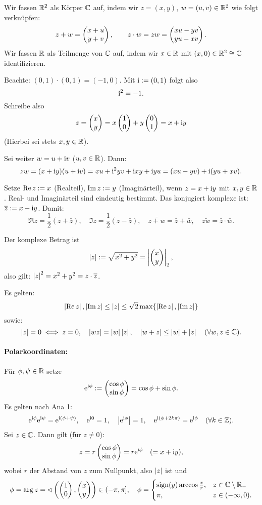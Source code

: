 \documentclass[a4paper,twoside,DIV15,BCOR12mm]{scrbook}
\begin{document}


Wir fassen $\mathbb{R}^2$ als Körper $\mathbb{C}$ auf, indem wir $z = (x,y)$, $w=(u,v)\in\mathbb{R}^2$ wie folgt verknüpfen:
\[z+w = \cmplx{x+u}{y+v},\qquad z\cdot w = zw = \cmplx{xu-yv}{yu-xv}.\]
Wir fassen $\mathbb{R}$ als Teilmenge von $\mathbb{C}$ auf, indem wir $x\in\mathbb{R}$ mit $(x,0)\in\mathbb{R}^2\cong\mathbb{C}$ identifizieren.

Beachte: $(0,1)\cdot(0,1) = (-1,0)$. Mit $\mathrm{i} := (0,1)$ folgt also
\[\mathrm{i}^2 = -1.\]
Schreibe also
\[z = \cmplx{x}{y} = x\cmplx{1}{0} + y\cmplx{0}{1} = x+\i y\]
(Hierbei sei stets $x,y\in\mathbb{R}$).

Sei weiter $w = u+\mathrm{i} v$ ($u,v\in\mathbb{R}$). Dann:
\[zw = (x+\mathrm{i} y)(u+\mathrm{i} v) = xu + \mathrm{i}^2 yv + \mathrm{i} xy + \mathrm{i} yu = (xu-yv) + \mathrm{i}(yu+xv).\]

Setze $\operatorname{Re}{z}:= x$ (Realteil), $\operatorname{Im}{z} := y$ (Imaginärteil), wenn $z=x+\mathrm{i} y$ mit $x,y\in\mathbb{R}$. Real- und Imaginärteil sind eindeutig bestimmt. Das konjugiert komplexe ist: $\overline{z}:= x-\mathrm{i} y$. Damit:
\[\Re{z} = \frac{1}{2}(z+\bar{z}),\quad\Im{z} = \frac{1}{2}(z-\bar{z}),\quad\bar{z+w} = \bar{z}+\bar{w},\quad\bar{zw}=\bar{z}\cdot\bar{w}.\]

Der komplexe Betrag ist
\[\displaystyle\left\lvert z\right\lvert:=\sqrt{x^2+y^2} = \left\lvert\left(\!\!\!\begin{array}{c}x\\y\end{array}\!\!\!\right)\right\lvert_2,\]
also gilt: $\left\lvert z\right\lvert^2 = x^2+y^2 = z\cdot\overline{z}$.


Es gelten:
\begin{equation}\label{1.1}
\left\lvert\operatorname{Re}{z}\right\lvert,\left\lvert\operatorname{Im}{z}\right\lvert\leq\left\lvert z\right\lvert\leq\sqrt{2}\max\{\left\lvert\operatorname{Re}{z}\right\lvert,\left\lvert\operatorname{Im}{z}\right\lvert\}
\end{equation}
sowie:
\[\left\lvert z\right\lvert=0\iff z = 0,\quad\left\lvert wz\right\lvert = \left\lvert w\right\lvert\left\lvert z\right\lvert,\quad\left\lvert w+z\right\lvert\leq\left\lvert w\right\lvert+\left\lvert z\right\lvert\quad(\forall w,z\in\mathbb{C}).\]

\paragraph{Polarkoordinaten:} Für $\phi,\psi\in\mathbb{R}$ setze
\[\mathrm{e}^{\mathrm{i}\phi}:=\left(\!\!\!\begin{array}{c}\cos\phi\\\sin\phi\end{array}\!\!\!\right) = \cos\phi + \sin\phi.\]
Es gelten nach Ana 1:
\[\mathrm{e}^{\mathrm{i}\phi}\mathrm{e}^{\mathrm{i}\psi} = \mathrm{e}^{\mathrm{i}(\phi+\psi)},\quad\mathrm{e}^{\mathrm{i}0} = 1,\quad\bigl|\mathrm{e}^{\mathrm{i}\phi}\bigr| = 1,\quad\mathrm{e}^{\mathrm{i}(\phi+2k\pi)} = \mathrm{e}^{\mathrm{i}\phi}\quad(\forall k\in\mathbb{Z}).\]
Sei $z\in\mathbb{C}$. Dann gilt (für $z\neq 0$):
\[z = r\left(\!\!\!\begin{array}{c}\cos\phi\\\sin\phi\end{array}\!\!\!\right) = r\mathrm{e}^{\mathrm{i}\phi}\quad(=x+\mathrm{i} y),\]
wobei $r$ der Abstand von $z$ zum Nullpunkt, also $\left\lvert z\right\lvert$ ist und
\[\phi = \arg{z} = \sphericalangle\left(\cmplx{1}{0},\cmplx{x}{y}\right)\in(-\pi,\pi],\quad\phi = \begin{cases}\sign(y)\arccos\frac{x}{r},&z\in\C\setminus\R_-\\\pi,&z\in(-\infty,0).\end{cases}\]
\end{document}
